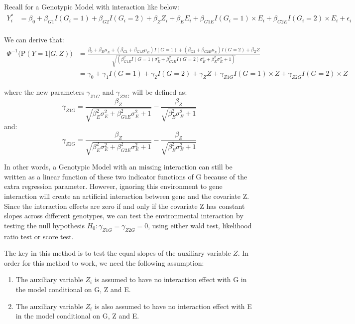 \documentclass[
]{article}
\begin{document}
Recall for a Genotypic Model with interaction like below:
\begin{equation}\label{eqn:genointer}
\begin{aligned}
Y_i^* &= \beta_0 + \beta_{G1} I(G_i = 1) + \beta_{G2} I(G_i = 2) + \beta_Z Z_i + \beta_E E_i + \beta_{G1E} I(G_i = 1) \times E_i + \beta_{G2E} I(G_i = 2) \times E_i  + \epsilon_i \\
\end{aligned}
\end{equation}

We can derive that: \begin{equation}\label{eqn:RStest}
\begin{aligned}
\Phi^{-1} \bigg(\text{P}(Y = 1 | G, Z) \bigg) &= \frac{\beta_0+\beta_E \mu_E+(\beta_{G1} + \beta_{G1E} \mu_E)I(G = 1)+(\beta_{G2} + \beta_{G2E} \mu_E)I(G = 2) + \beta_Z Z}{\sqrt{(\beta_{G1E}^2 I(G = 1) \sigma_E^2 +\beta_{G2E}^2 I(G = 2) \sigma_E^2 + \beta_E^2 \sigma_E^2 + 1)}} \\
&= \gamma_0 + \gamma_1 I(G = 1) + \gamma_2 I(G = 2) + \gamma_Z Z + \gamma_{Z1G} I(G = 1) \times Z + \gamma_{Z2G} I(G = 2) \times Z
\end{aligned}
\end{equation}

where the new parameters \(\gamma_{Z1G}\) and \(\gamma_{Z2G}\) will be
defined as:
\[\gamma_{Z1G} = \frac{\beta_Z}{\sqrt{\beta_E^2\sigma_E^2+\beta_{G1E}^2\sigma_E^2 +1}}-\frac{\beta_Z}{\sqrt{\beta_E^2\sigma_E^2 +1}} \]
and:
\[\gamma_{Z2G} = \frac{\beta_Z}{\sqrt{\beta_E^2\sigma_E^2+\beta_{G2E}^2\sigma_E^2 +1}}-\frac{\beta_Z}{\sqrt{\beta_E^2\sigma_E^2 +1}} \]

In other words, a Genotypic Model with an missing interaction can still
be written as a linear function of these two indicator functions of G
because of the extra regression parameter. However, ignoring this
environment to gene interaction will create an artificial interaction
between gene and the covariate Z. Since the interaction effects are zero
if and only if the covariate Z has constant slopes across different
genotypes, we can test the environmental interaction by testing the null
hypothesis \(H_0: \gamma_{Z1G} = \gamma_{Z2G} = 0\), using either wald
test, likelihood ratio test or score test.

The key in this method is to test the equal slopes of the auxiliary
variable \(Z\). In order for this method to work, we need the following
assumption:

\begin{enumerate}
\item The auxiliary variable $Z_i$ is assumed to have no interaction effect with G in the model conditional on G, Z and E.
\item The auxiliary variable $Z_i$ is also assumed to have no interaction effect with E in the model conditional on G, Z and E.



\end{enumerate}
\end{document}
